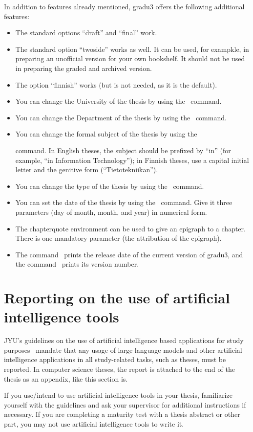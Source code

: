 \documentclass[utf8,english]{gradu3}
\begin{document}
In addition to features already mentioned, gradu3 offers the following
additional features:
\begin{itemize}
\item The standard options ``draft'' and ``final''  work.
\item The standard option ``twoside'' works as well.  It can be used,
  for exampkle, in preparing an unofficial version for your own
  bookshelf.  It should not be used in preparing the graded and
  archived version.
\item The option ``finnish'' works (but is not needed, as it is the default).
\item You can change the University of the thesis by using the
  \string\university\ command.
\item You can change the Department of the thesis by using the
  \string\department\ command.
\item You can change the formal subject of the thesis by using the
  \string\subject\ command.  In English theses, the subject should be
  prefixed by ``in'' (for example, ``in Information Technology''); in
  Finnish theses, use a capital initial letter and the genitive form
  (``Tietotekniikan'').
\item You can change the type of the thesis by using the \string\type\
  command.
\item You can set the date of the thesis by using the \string\setdate\
  command.  Give it three parameters (day of month, month, and year)
  in numerical form.
\item The chapterquote environment can be used to give an epigraph to
  a chapter.  There is one mandatory parameter (the attribution of the
  epigraph).
\item The command \string\graduclsdate\ prints the release date of the
  current version of gradu3, and the command \string\graduclsversion\
  prints its version number.
\end{itemize}

\section{Reporting on the use of artificial intelligence tools}
JYU's guidelines on the use of artificial intelligence based
applications for study purposes~\cite{jyu-tekoaly} mandate that any
usage of large language models and other artificial intelligence
applications in all study-related tasks, such as theses, must be
reported. In computer science theses, the report is attached to the
end of the thesis as an appendix, like this section is.

If you use/intend to use artificial intelligence tools in your thesis,
familiarize yourself with the guidelines and ask your supervisor for
additional instructions if necessary. If you are completing a maturity
test with a thesis abstract or other part, you may not use artificial
intelligence tools to write it.
\end{document}
